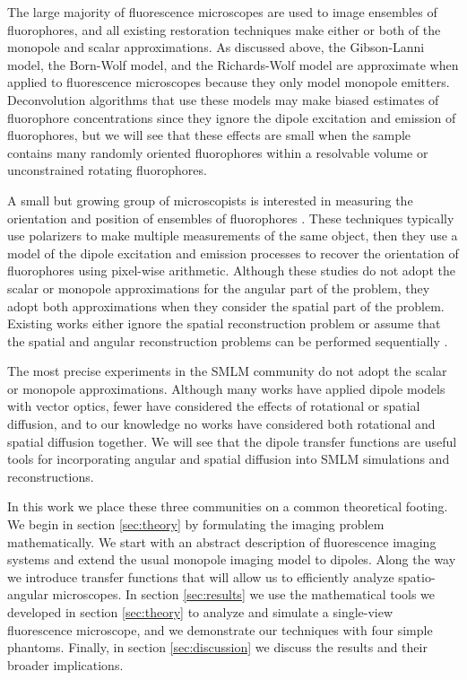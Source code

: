 \documentclass[]{osa-article}
\begin{document}
The large majority of fluorescence microscopes are used to image ensembles of
fluorophores, and all existing restoration techniques make either or both of the
monopole and scalar approximations. As discussed above, the Gibson-Lanni model,
the Born-Wolf model, and the Richards-Wolf model are approximate when applied to
fluorescence microscopes because they only model monopole emitters.
Deconvolution algorithms that use these models may make biased estimates of
fluorophore concentrations since they ignore the dipole excitation and emission
of fluorophores, but we will see that these effects are small when the sample
contains many randomly oriented fluorophores within a resolvable volume or
unconstrained rotating fluorophores.

A small but growing group of microscopists is interested in measuring the
orientation and position of ensembles of fluorophores \cite{vrabioiu2006,
  mattheyses2010, mehta2016, mcquilken2017, zhanghao2017}. These techniques
typically use polarizers to make multiple measurements of the same object, then
they use a model of the dipole excitation and emission processes
\cite{fourkas2001} to recover the orientation of fluorophores using pixel-wise
arithmetic. Although these studies do not adopt the scalar or monopole
approximations for the angular part of the problem, they adopt both
approximations when they consider the spatial part of the problem. Existing
works either ignore the spatial reconstruction problem \cite{vrabioiu2006,
  mattheyses2010, mehta2016, mcquilken2017} or assume that the spatial and
angular reconstruction problems can be performed sequentially
\cite{zhanghao2017}.

The most precise experiments in the SMLM community do not adopt the scalar or
monopole approximations. Although many works have applied dipole models with
vector optics, fewer have considered the effects of rotational or spatial
diffusion, and to our knowledge no works have considered both rotational and
spatial diffusion together. We will see that the dipole transfer functions are
useful tools for incorporating angular and spatial diffusion into SMLM
simulations and reconstructions.

In this work we place these three communities on a common theoretical footing.
We begin in section \ref{sec:theory} by formulating the imaging problem
mathematically. We start with an abstract description of fluorescence imaging
systems and extend the usual monopole imaging model to dipoles. Along the way we
introduce transfer functions that will allow us to efficiently analyze
spatio-angular microscopes. In section \ref{sec:results} we use the mathematical
tools we developed in section \ref{sec:theory} to analyze and simulate a
single-view fluorescence microscope, and we demonstrate our techniques with four
simple phantoms. Finally, in section \ref{sec:discussion} we discuss the results
and their broader implications.
\end{document}
